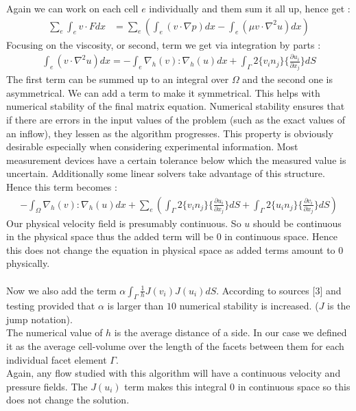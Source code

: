 \documentclass[11pt,twoside,a4paper]{article}
\begin{document}
Again we can work on each cell $e$ individually and them sum it all up, hence get :
\begin{align*}
\sum_e \int_e v \cdot F dx &= \sum_e (\int_e (v \cdot \nabla p) dx - \int_e (\mu v \cdot \nabla^2 u) dx)
\end{align*}
Focusing on the viscosity, or second, term we get via integration by parts :
\begin{align*}
\int_e (v \cdot \nabla^2 u) dx = - \int_e \nabla_h(v) : \nabla_h(u) dx + \int_\Gamma 2 \{ v_i n_j \} \{ \frac{\partial u_i}{\partial x_j}\} dS
\end{align*}
The first term can be summed up to an integral over $\Omega$ and the second one is asymmetrical. We can add a term to make it symmetrical. This helps with numerical stability of the final matrix equation. Numerical stability ensures that if there are errors in the input values of the problem (such as the exact values of an inflow), they lessen as the algorithm progresses. This property is obviously desirable especially when considering experimental information. Most measurement devices have a certain tolerance below which the measured value is uncertain. Additionally some linear solvers take advantage of this structure.\\
Hence this term becomes :
\begin{align*}
-  \int_\Omega \nabla_h(v) : \nabla_h(u) dx + \sum_e( \int_\Gamma 2 \{ v_i n_j \} \{ \frac{\partial u_i}{\partial x_j}\} dS + \int_\Gamma 2 \{ u_i n_j \} \{ \frac{\partial v_i}{\partial x_j}\} dS)
\end{align*}
Our physical velocity field is presumably continuous.
So $u$ should be continuous in the physical space thus the added term will be $0$ in continuous space. Hence this does not change the equation in physical space as added terms amount to $0$ physically.\\
\\
Now we also add the term $\alpha \int_\Gamma \frac{1}{h}  J(v_i) J(u_i) dS$. According to sources [3] and testing provided that  $\alpha$ is larger than $10$ numerical stability is increased.
($J$ is the jump notation).\\
The numerical value of $h$ is the average distance of a side. In our case we defined it as the average cell-volume over the length of the facets between them for each individual facet element $\Gamma$.\\
Again, any flow studied with this algorithm will have a continuous velocity and pressure fields. The $J(u_i)$ term makes this integral $0$ in continuous space so this does not change the solution.\\
\end{document}
